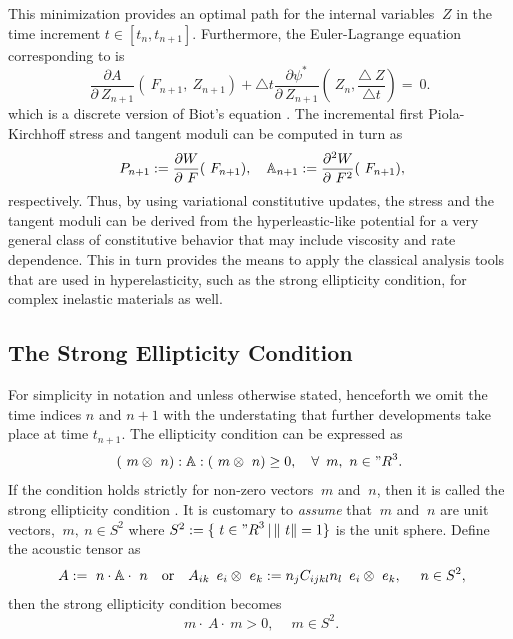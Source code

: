 \documentclass[12pt]{article}
\numberwithin{equation}{section}
\begin{document}
This minimization provides an optimal path for the internal variables
$~Z$ in the time increment $t \in [t_n, t_{n+1}]$. Furthermore, the
Euler-Lagrange equation corresponding to
 is
\begin{equation} \label{eq:Biots-equation-discrete}
  \frac{\partial A}{\partial ~Z_{n+1}}(~F_{n+1}, ~Z_{n+1})
  +
  \triangle t
  \frac{\partial \psi^*}{\partial ~Z_{n+1}}
  \left(~Z_n, \frac{\triangle ~Z}{\triangle t}\right)
  =
  ~0.
\end{equation}
which is a discrete version of Biot's equation
 \citep{Miehe.etal:2002}. The
incremental first Piola-Kirchhoff stress and tangent moduli can be
computed in turn as
\begin{equation} \label{eq:incremental-stress-moduli}
  ~P_{n+1} := \frac{\partial W}{\partial ~F} (~F_{n+1}),
  \quad
  \mathbb{A}_{n+1} := \frac{\partial^2 W}{\partial ~F^2} (~F_{n+1}),
\end{equation}
respectively. Thus, by using variational constitutive updates, the
stress and the tangent moduli can be derived from the
hyperleastic-like potential  for
a very general class of constitutive behavior that may include
viscosity and rate dependence. This in turn provides the means to
apply the classical analysis tools that are used in hyperelasticity,
such as the strong ellipticity condition, for complex inelastic
materials as well.

\subsection{The Strong Ellipticity Condition}

For simplicity in notation and unless otherwise stated, henceforth we
omit the time indices $n$ and $n+1$ with the understating that further
developments take place at time $t_{n+1}$.  The ellipticity condition
can be expressed as
\begin{equation} \label{eq:strong-ellipticity}
  (~m \otimes ~n) : \mathbb{A} : (~m \otimes ~n) \ge 0,
  \quad
  \forall \, ~m, ~n \in {"R}^3.
\end{equation}
If the condition holds strictly for non-zero vectors $~m$ and $~n$,
then it is called the strong ellipticity condition
\citep{Hadamard:1903, Truesdell.Noll:2004, Miehe.etal:2004}. It is
customary to \emph{assume} that $~m$ and $~n$ are unit vectors, \ie
$~m, ~n \in S^2$ where $S^2 := \{ ~t \in {"R}^3 \, | \, \| ~t \| =
1\}$ is the unit sphere. Define the acoustic tensor as
\begin{equation} \label{eq:acoustic-tensor}
  ~A := ~n \cdot \mathbb{A} \cdot ~n
  \quad \text{or} \quad
  A_{ik} \, ~e_i \otimes ~e_k := n_j C_{ijkl} n_l \, ~e_i \otimes ~e_k,
  \quad
  ~n \in S^2,
\end{equation}
then the strong ellipticity condition becomes
\begin{equation} \label{eq:acoustic-ellipticity}
  ~m \cdot ~A \cdot ~m > 0, \quad ~m \in S^2.
\end{equation}
\end{document}

